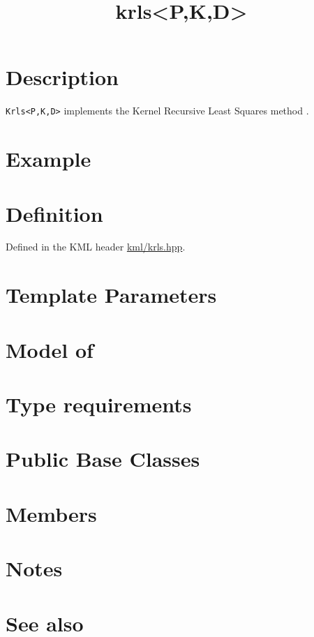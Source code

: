\documentclass{article}
\begin{document}
\title{krls<P,K,D>}
\maketitle

\section*{Description}

\texttt{Krls<P,K,D>} implements the Kernel Recursive Least Squares method \cite{engel03kernel}.

\section*{Example}
\section*{Definition}

Defined in the KML header \href{\kmlsvnroot/kml/krls.hpp}{kml/krls.hpp}.

\section*{Template Parameters}
\section*{Model of}
\section*{Type requirements}
\section*{Public Base Classes}
\section*{Members}
\section*{Notes}
\section*{See also}



\end{document}
